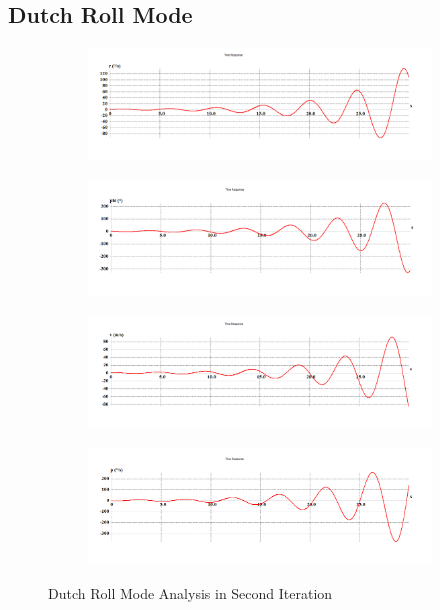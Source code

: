 \subsection{Dutch Roll Mode}
\begin{figure}[H]
\begin{subfigure}{0.48\textwidth}
\includegraphics[width = \linewidth]{r__5_.png}
\end{subfigure}
\begin{subfigure}{0.48\textwidth}
\includegraphics[width = \linewidth]{phi__5_.png}
\end{subfigure}
\medskip
\begin{subfigure}{0.48\textwidth}
\includegraphics[width = \linewidth]{v__5_.png}
\end{subfigure}
\begin{subfigure}{0.48\textwidth}
\includegraphics[width = \linewidth]{p__5_.png}
\end{subfigure}
\caption{Dutch Roll Mode Analysis in Second Iteration}
\end{figure}

